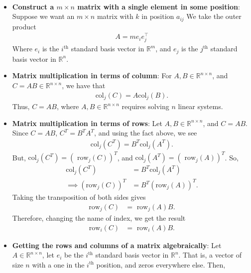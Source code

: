 \documentclass{report}
\begin{document}
\begin{itemize}
\begin{align*}
            \end{align*}
        \item \textbf{Construct a $m\times n$ matrix with a single element in some position}: Suppose we want an $m\times n$ matrix with $k$ in position $a_{ij}$ We take the outer product
            \begin{align*}
               A = me_{i}e_{j}^{\top}
            \end{align*}
            Where $e_{i}$ is the $i^{\text{th}} $ standard basis vector in $\mathbb{R}^{m}$, and $e_{j}$ is the $j^{\text{th}}$ standard basis vector in $\mathbb{R}^{n}$.
        \item \textbf{Matrix multiplication in terms of column}: For $A,B \in \mathbb{R}^{n\times n}$, and $C = AB \in \mathbb{R}^{n\times n}$, we have that
            \begin{align*}
                \text{col}_{j}(C) = A\text{col}_{j}(B)
            .\end{align*}
            Thus, $C=AB$, where $A,B \in \mathbb{R}^{n\times n}$ requires solving $n$ linear systems.
        \item \textbf{Matrix multiplication in terms of rows}: Let $A,B\in \mathbb{R}^{n\times n} $, and $C = AB$. Since $C = AB$, $C^{T} = B^{T}A^{T}$, and using the fact above, we see
            \begin{align*}
                \text{col}_{j}(C^{T}) = B^{T}\text{col}_{j}(A^{T})        
            .\end{align*}
            But, $\text{col}_{j}(C^{T}) = (\text{ row}_{j}(C))^{T}$, and $\text{col}_{j}(A^{T}) = (\text{ row}_{j}(A))^{T} $. So,
            \begin{align*}
                \text{col}_{j}(C^{T}) &= B^{T}\text{col}_{j}(A^{T})         \\
                \implies \left(\text{row}_{j}(C)\right)^{T} &= B^{T}\left(\text{row}_{j}(A)\right)^{T}
            .\end{align*}
            Taking the transposition of both sides gives
            \begin{align*}
                \text{row}_{j}(C) &= \text{ row}_{j}(A)B
            .\end{align*}
            Therefore, changing the name of index, we get the result
            \begin{align*}
                \text{row}_{i}(C) &= \text{ row}_{i}(A)B
            .\end{align*}
        \item \textbf{Getting the rows and columns of a matrix algebraically}: Let $A \in \mathbb{R}^{n\times n}$, let $e_{i}$ be the $i^{\text{th}}$ standard basis vector in $\mathbb{R}^{n}$. That is, a vector of size $n$ with a one in the $i^{\text{th}}$ position, and zeros everywhere else. Then,

\end{itemize}
\end{document}
